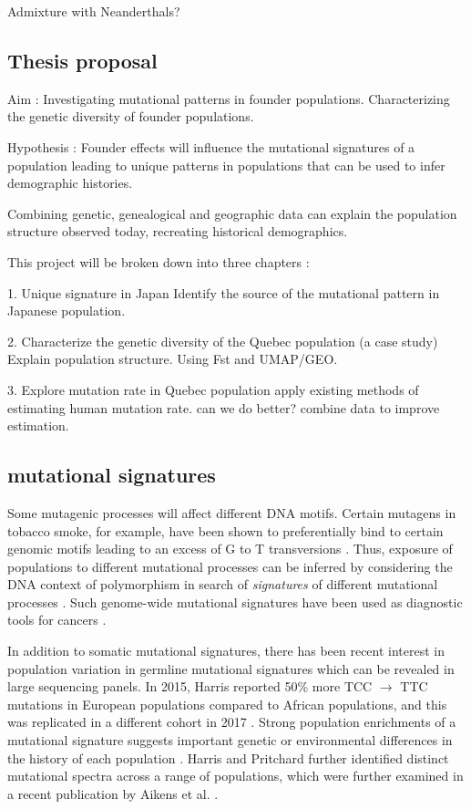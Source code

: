 \documentclass[
11pt, %
oneside, %
english, %
doublespacing, %
headsepline, %
]{MastersDoctoralThesis} %
\begin{document}
Admixture with Neanderthals?





\subsection{Thesis proposal}
Aim : Investigating mutational patterns in founder populations. 
Characterizing the genetic diversity of founder populations. 

Hypothesis : 
Founder effects will influence the mutational signatures of a population leading to unique patterns in populations that can be used to infer demographic histories.

Combining genetic, genealogical and geographic data can explain the population structure observed today, recreating historical demographics.

This project will be broken down into three chapters :

1. Unique signature in Japan
Identify the source of the mutational pattern in Japanese population. 

2. Characterize the genetic diversity of the Quebec population (a case study)
Explain population structure. Using Fst and UMAP/GEO.

3. Explore mutation rate in Quebec population
apply existing methods of estimating human mutation rate.
can we do better? combine data to improve estimation. 

\subsection{mutational signatures}
Some mutagenic processes will affect different DNA motifs. 
Certain mutagens in tobacco smoke, for example, have been shown to preferentially bind to certain genomic motifs leading to an excess of G to T transversions \citep{Pfeifer2002,Pleasance2010}. 
Thus, exposure of populations to different mutational processes can be inferred by considering the DNA context of polymorphism in search of \textit{signatures} of different mutational processes \citep{Alexandrov2013,Shiraishi2015a}. 
Such genome-wide mutational signatures have been used as diagnostic tools for cancers \citep{Alexandrov2013,Shiraishi2015a}.

In addition to somatic mutational signatures, there has been recent interest in population variation in germline mutational signatures which can be revealed in large sequencing panels. 
In 2015, Harris reported 50\% more TCC ${\rightarrow}$ TTC mutations in European populations compared to African populations, and this was replicated in a different cohort in 2017 \citep{Harris2015a, Harris2017a, Mathieson2017a}. 
Strong population enrichments of a mutational signature suggests important genetic or environmental differences in the history of each population \citep{Harris2015a, Harris2017a}. 
Harris and Pritchard further identified distinct mutational spectra across a range of populations, which were further examined in a recent publication by Aikens et al. \citep{Harris2017a,Aikens2018}.
 
\end{document}
